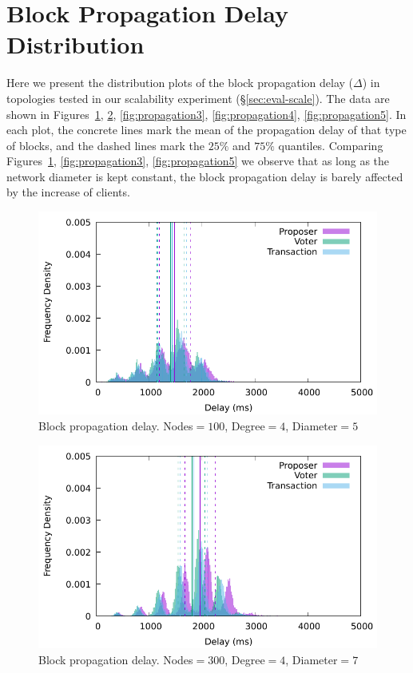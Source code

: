 \section{Block Propagation Delay Distribution}
\label{apx:propagation}

 Here we present the distribution plots of the block propagation delay ($\Delta$) in topologies tested in our scalability experiment (\S\ref{sec:eval-scale}). The data are shown in Figures~\ref{fig:propagation1}, \ref{fig:propagation2}, \ref{fig:propagation3}, \ref{fig:propagation4}, \ref{fig:propagation5}. In each plot, the concrete lines mark the mean of the propagation delay of that type of blocks, and the dashed lines mark the $25\%$ and $75\%$ quantiles. Comparing Figures~\ref{fig:propagation1}, \ref{fig:propagation3}, \ref{fig:propagation5} we observe that as long as the network diameter is kept constant, the block propagation delay is barely affected by the increase of clients.


\begin{figure}[t]
   \centering
   \includegraphics[width=\linewidth]{figures/delay100nodes.pdf}
   \caption{Block propagation delay. Nodes$=100$, Degree$=4$, Diameter$=5$}%
   \label{fig:propagation1}
 \end{figure}
 
 \begin{figure}[t]
   \centering
   \includegraphics[width=\linewidth]{figures/delay300nodes4.pdf}
   \caption{Block propagation delay. Nodes$=300$, Degree$=4$, Diameter$=7$}%
   \label{fig:propagation2}
 \end{figure}
 
